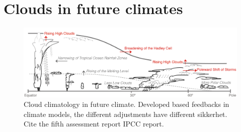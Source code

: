 \section{Clouds in future climates} \label{sec:intro_cloud_future_climates}
\begin{figure}[h]
    \centering
    \includegraphics[scale = 0.8]{Chapter1_Intro/images/Fig7-11_ipcc.jpg}
    \caption{Cloud climatology in future climate. Developed based feedbacks in climate models, the different adjustments have different sikkerhet. Cite the fifth assessment report IPCC report.}
    \label{fig:cloud_scheme}
\end{figure}

